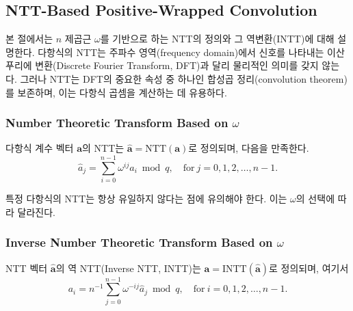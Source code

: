 \subsection{NTT-Based Positive-Wrapped Convolution}

본 절에서는 $n$ 제곱근 $\omega$를 기반으로 하는 NTT의 정의와 그 역변환(INTT)에 대해 설명한다. 다항식의 NTT는 주파수 영역(frequency domain)에서 신호를 나타내는 이산 푸리에 변환(Discrete Fourier Transform, DFT)과 달리 물리적인 의미를 갖지 않는다. 그러나 NTT는 DFT의 중요한 속성 중 하나인 합성곱 정리(convolution theorem)를 보존하며, 이는 다항식 곱셈을 계산하는 데 유용하다.

\subsubsection{Number Theoretic Transform Based on $\omega$}

\begin{tcolorbox}[colback=white, boxrule=0.7pt, sharp corners]
\begin{definition}
다항식 계수 벡터 $\mathbf{a}$의 NTT는 $\mathbf{\hat{a}} = \text{NTT}(\mathbf{a})$로 정의되며, 다음을 만족한다.
\begin{equation}
    \hat{a}_j = \sum_{i=0}^{n-1} \omega^{ij} a_i \bmod q, \quad \text{for} \ j = 0, 1, 2, \dots, n-1.
\end{equation}
\end{definition}
\end{tcolorbox}

특정 다항식의 NTT는 항상 유일하지 않다는 점에 유의해야 한다. 이는 $\omega$의 선택에 따라 달라진다.

\subsubsection{Inverse Number Theoretic Transform Based on $\omega$}

\begin{tcolorbox}[colback=white, boxrule=0.7pt, sharp corners]
\begin{definition}
NTT 벡터 $\mathbf{\hat{a}}$의 역 NTT(Inverse NTT, INTT)는 $\mathbf{a} = \text{INTT}(\mathbf{\hat{a}})$로 정의되며, 여기서
\begin{equation}
    a_i = n^{-1}\sum_{j=0}^{n-1} \omega^{-ij}\hat{a}_j \bmod q, \quad \text{for} \ i = 0, 1, 2, \dots, n-1.
\end{equation}
\end{definition}
\end{tcolorbox}

